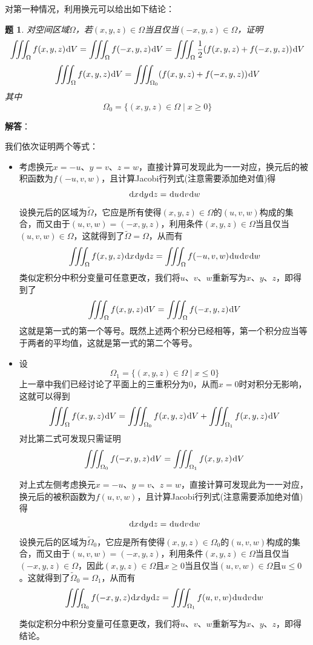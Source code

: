 \documentclass[a4paper,UTF8,fontset=windows,AutoFakeBold]{ctexart}
\newcommand*{\dr}{\hspace{0.07em}\mathrm{d}}
\theoremstyle{ex}
\newtheorem{exercise}{题}
\newcommand{\sol}[1]{{\vspace{5pt}\kaishu\noindent\textbf{解答}：\vspace{-3pt}
\begin{compactitem}
    \item[] #1
\end{compactitem}
}}
\begin{document}
对第一种情况，利用换元可以给出如下结论：
\begin{framed}
\begin{exercise}
    对空间区域$\Omega$，若$(x,y,z)\in\Omega$当且仅当$(-x,y,z)\in\Omega$，证明
    $$\iiint_\Omega f(x,y,z)\dr V=\iiint_\Omega f(-x,y,z)\dr V=\iiint_\Omega\frac{1}{2}(f(x,y,z)+f(-x,y,z))\dr V$$
    $$\iiint_\Omega f(x,y,z)\dr V=\iiint_{\Omega_0}(f(x,y,z)+f(-x,y,z))\dr V$$
    其中
    $$\Omega_0=\{(x,y,z)\in\Omega\mid x\ge0\}$$
\end{exercise}
\sol{
    我们依次证明两个等式：
    \begin{itemize}
        \item 考虑换元$x=-u$、$y=v$、$z=w$，直接计算可发现此为一一对应，换元后的被积函数为$f(-u,v,w)$，且计算Jacobi行列式(注意需要添加绝对值)得
        $$\dr x\dr y\dr z=\dr u\dr v\dr w$$
        设换元后的区域为$\tilde\Omega$，它应是所有使得$(x,y,z)\in\Omega$的$(u,v,w)$构成的集合，而又由于$(u,v,w)=(-x,y,z)$，利用条件$(x,y,z)\in\Omega$当且仅当$(u,v,w)\in\Omega$，这就得到了$\tilde\Omega=\Omega$，从而有
        $$\iiint_\Omega f(x,y,z)\dr x\dr y\dr z=\iiint_\Omega f(-u,v,w)\dr u\dr v\dr w$$
        类似定积分中积分变量可任意更改，我们将$u$、$v$、$w$重新写为$x$、$y$、$z$，即得到了
        $$\iiint_\Omega f(x,y,z)\dr V=\iiint_\Omega f(-x,y,z)\dr V$$
        这就是第一式的第一个等号。既然上述两个积分已经相等，第一个积分应当等于两者的平均值，这就是第一式的第二个等号。
        \item 设
        $$\Omega_1=\{(x,y,z)\in\Omega\mid x\le0\}$$
        上一章中我们已经讨论了平面上的三重积分为0，从而$x=0$时对积分无影响，这就可以得到
        $$\iiint_\Omega f(x,y,z)\dr V=\iiint_{\Omega_0}f(x,y,z)\dr V+\iiint_{\Omega_1}f(x,y,z)\dr V$$
        对比第二式可发现只需证明
        $$\iiint_{\Omega_0}f(-x,y,z)\dr V=\iiint_{\Omega_1}f(x,y,z)\dr V$$

        对上式左侧考虑换元$x=-u$、$y=v$、$z=w$，直接计算可发现此为一一对应，换元后的被积函数为$f(u,v,w)$，且计算Jacobi行列式(注意需要添加绝对值)得
        $$\dr x\dr y\dr z=\dr u\dr v\dr w$$
        设换元后的区域为$\tilde\Omega_0$，它应是所有使得$(x,y,z)\in\Omega_0$的$(u,v,w)$构成的集合，而又由于$(u,v,w)=(-x,y,z)$，利用条件$(x,y,z)\in\Omega$当且仅当$(-x,y,z)\in\Omega$，因此$(x,y,z)\in\Omega$且$x\ge0$当且仅当$(u,v,w)\in\Omega$且$u\le0$。这就得到了$\tilde\Omega_0=\Omega_1$，从而有
        $$\iiint_{\Omega_0}f(-x,y,z)\dr x\dr y\dr z=\iiint_{\Omega_1}f(u,v,w)\dr u\dr v\dr w$$

        类似定积分中积分变量可任意更改，我们将$u$、$v$、$w$重新写为$x$、$y$、$z$，即得结论。
    \end{itemize}
}
\end{framed}
\end{document}
